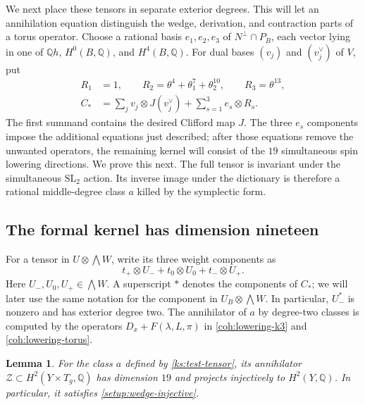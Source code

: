 \documentclass[11pt]{article}
\numberwithin{equation}{section}
\newtheorem{lemma}[theorem]{Lemma}
\theoremstyle{definition}
\theoremstyle{remark}
\begin{document}
We next place these tensors in separate exterior degrees.  This will
let an annihilation equation distinguish the wedge, derivation, and
contraction parts of a torus operator.  Choose a rational basis
$e_1,e_2,e_3$ of $N^\perp\cap P_B$,
each vector lying in one of $\mathbb Q h$, $H^0(B,\mathbb Q)$, and
$H^4(B,\mathbb Q)$.  For dual bases $(v_j)$ and $(v_j^\vee)$ of
$V$, put
\begin{equation}
 \label{ks:test-tensor}
 \begin{split}
 R_1&=1,\qquad
 R_2=\theta^4+\theta_1^7+\theta_2^{10},\qquad
 R_3=\theta^{13},\\
 C_*&=\sum_jv_j\otimes J(v_j^\vee)
            +\sum_{s=1}^3e_s\otimes R_s.
 \end{split}
\end{equation}
The first summand contains the desired Clifford map $J$.
The three $e_s$ components impose the additional equations just
described; after those equations remove the unwanted operators,
the remaining kernel will consist of the $19$ simultaneous spin
lowering directions.  We prove this next.
The full tensor is invariant under the simultaneous $\mathrm{SL}_2$
action.  Its inverse image under the dictionary is therefore
a rational middle-degree class $a$ killed by the symplectic
form.

\subsection{The formal kernel has dimension nineteen}
\label{ks:formal-kernel-section}

For a tensor in $U\otimes\bigwedge W$, write its three weight
components as
\begin{equation}
 \label{ks:weight-components}
 t_+\otimes U_-+t_0\otimes U_0+t_-\otimes U_+.
\end{equation}
Here $U_-,U_0,U_+\in\bigwedge W$.  A superscript $*$ denotes
the components of $C_*$; we will later use the same notation for
the component in $U_B\otimes\bigwedge W$.
In particular, $U_-^*$ is nonzero and has exterior degree two.
The annihilator of $a$ by degree-two classes is computed by
the operators $D_x+F(\lambda,L,\pi)$ in
\eqref{coh:lowering-k3} and \eqref{coh:lowering-torus}.

\begin{lemma}
 \label{ks:formal-kernel}
For the class $a$ defined by \eqref{ks:test-tensor}, its
annihilator $\mathcal Z\subset H^2(Y\times T_g,\mathbb Q)$ has
dimension $19$ and projects injectively to $H^2(Y,\mathbb Q)$.
In particular, it satisfies \eqref{setup:wedge-injective}.
\end{lemma}
\end{document}

